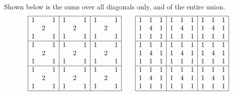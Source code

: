 Shown below is the sums over all diagonals only,
and of the entire union.
\[
 \begin{array}{|ccc|ccc|ccc|} \hline
  1 &   & 1 & 1 &   & 1 & 1 &   & 1 \\
  & 2 &   &   & 2 &   &   & 2 &   \\
  1 &   & 1 & 1 &   & 1 & 1 &   & 1 \\\hline
  1 &   & 1 & 1 &   & 1 & 1 &   & 1 \\
  & 2 &   &   & 2 &   &   & 2 &   \\
  1 &   & 1 & 1 &   & 1 & 1 &   & 1 \\\hline
  1 &   & 1 & 1 &   & 1 & 1 &   & 1 \\
  & 2 &   &   & 2 &   &   & 2 &   \\
  1 &   & 1 & 1 &   & 1 & 1 &   & 1 \\\hline
 \end{array}
 \qquad
 \begin{array}{|ccc|ccc|ccc|} \hline
    1 & 1 & 1 & 1 & 1 & 1 & 1 & 1 & 1 \\
    1 & 4 & 1 & 1 & 4 & 1 & 1 & 4 & 1 \\
    1 & 1 & 1 & 1 & 1 & 1 & 1 & 1 & 1 \\\hline
    1 & 1 & 1 & 1 & 1 & 1 & 1 & 1 & 1 \\
    1 & 4 & 1 & 1 & 4 & 1 & 1 & 4 & 1 \\
    1 & 1 & 1 & 1 & 1 & 1 & 1 & 1 & 1 \\\hline
    1 & 1 & 1 & 1 & 1 & 1 & 1 & 1 & 1 \\
    1 & 4 & 1 & 1 & 4 & 1 & 1 & 4 & 1 \\
    1 & 1 & 1 & 1 & 1 & 1 & 1 & 1 & 1 \\\hline
 \end{array}
\]
